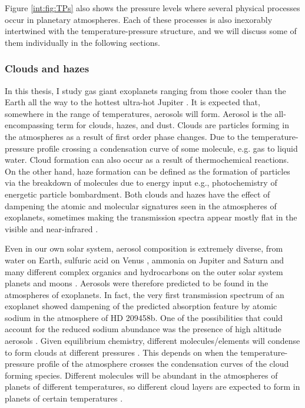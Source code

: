 Figure \ref{int:fig:TPs} also shows the pressure levels where several physical processes occur in planetary atmospheres. Each of these processes is also inexorably intertwined with the temperature-pressure structure, and we will discuss some of them individually in the following sections.

\subsubsection{Clouds and hazes}

In this thesis, I study gas giant exoplanets ranging from those cooler than the Earth \citep[Kepler-16b, 200K;][]{Doyle2011} all the way to the hottest ultra-hot Jupiter \citep[KELT-9b, 4000K;][]{Gaudi2017}. It is expected that, somewhere in the range of temperatures, aerosols will form. Aerosol is the all-encompassing term for clouds, hazes, and dust. Clouds are particles forming in the atmospheres as a result of first order phase changes. Due to the temperature-pressure profile crossing a condensation curve of some molecule, e.g. gas to liquid water. Cloud formation can also occur as a result of thermochemical reactions. On the other hand, haze formation can be defined as the formation of particles via the breakdown of molecules due to energy input e.g., photochemistry of energetic particle bombardment. Both clouds and hazes have the effect of dampening the atomic and molecular signatures seen in the atmospheres of exoplanets, sometimes making the transmission spectra appear mostly flat in the visible and near-infrared \citep[e.g.,][]{Charbonneau2002, Fortney2003, Pont2008}.

Even in our own solar system, aerosol composition is extremely diverse, from water on Earth, sulfuric acid on Venus \citep{Hansen1974}, ammonia on Jupiter and Saturn \citep{Booke1998, Baines2009} and many different complex organics and hydrocarbons on the outer solar system planets and moons \citep[e.g.,][]{Sromovsky2011, Romani1988, Sagan1992, Brown2002, Rages1992}. Aerosols were therefore predicted to be found in the atmospheres of exoplanets. In fact, the very first transmission spectrum of an exoplanet showed dampening of the predicted absorption feature by atomic sodium in the atmosphere of HD 209458b. One of the possibilities that could account for the reduced sodium abundance was the presence of high altitude aerosols \citep{Charbonneau2002}. Given equilibrium chemistry, different molecules/elements will condense to form clouds at different pressures \citep{Lodders2004}. This depends on when the temperature-pressure profile of the atmosphere crosses the condensation curves of the cloud forming species. Different molecules will be abundant in the atmospheres of planets of different temperatures, so different cloud layers are expected to form in planets of certain temperatures \citep{Marley2013}.

